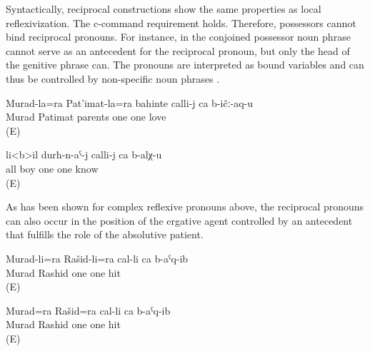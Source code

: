 Syntactically, reciprocal constructions show the same properties as local reflexivization. The c-command
requirement holds. Therefore, possessors cannot bind reciprocal pronouns. For instance, in  the conjoined possessor noun phrase cannot serve as an antecedent for the reciprocal pronoun, but only the head of the genitive phrase can. The pronouns are interpreted as bound variables and can thus be controlled by non-specific noun phrases .
%
\begin{exe}
	\ex	\label{ex:Murad and Patimat's parents love each other.}
	\gll	Murad-la=ra Pat'imat-la=ra bahinte calli-j ca b-ičː-aq-u\\
		Murad	Patimat	parents	one	one	love\\
	\glt	{} (E)

	\ex	\label{ex:All boys know each other}
	\gll	li<b>il	durħ-n-aˁ-j	calli-j	ca	b-alχ-u\\
		all	 boy	one	one	know\\
	\glt	{} (E)
\end{exe}

As has been shown for complex reflexive pronouns above, the reciprocal pronouns can also occur in the position of the ergative agent controlled by an antecedent that fulfills the role of the absolutive patient. 
%
\begin{exe}
	\ex	\label{ex:‎Murad and Rashid hit each other}
	\begin{xlist}
		\ex	\label{ex:‎Murad and Rashid hit each other@A}
		\gll	Murad-li=ra	Rašid-li=ra	cal-li	ca	b-aˁq-ib\\
			Murad	Rashid	one	one	hit\\
		\glt	{} (E)
	
		\ex	\label{ex:‎Murad and Rashid hit each other@B}
		\gll	Murad=ra	Rašid=ra	cal-li	ca	b-aˁq-ib\\
			Murad\tsc{=add}	Rashid	one	one	hit\\
		\glt	{} (E)
	\end{xlist}
\end{exe}

